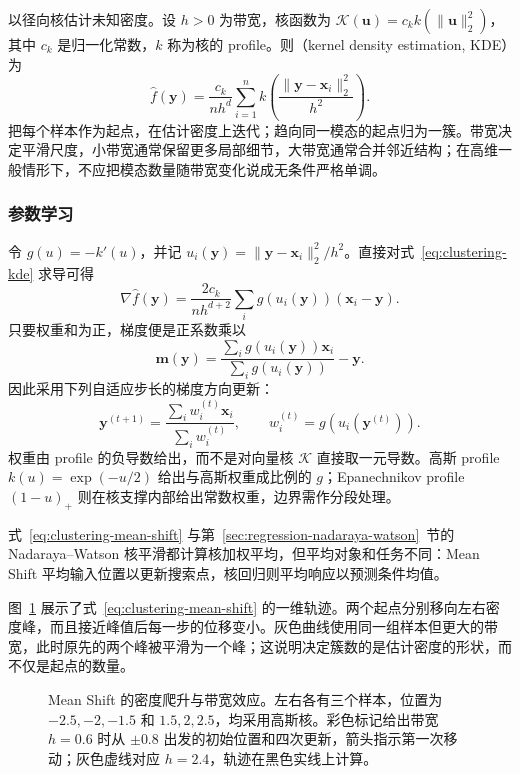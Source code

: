 以径向核估计未知密度。设 $h>0$ 为带宽，核函数为 $\mathcal{K}(\bm{u})=c_k k(\lVert\bm{u}\rVert_2^2)$，其中 $c_k$ 是归一化常数，$k$ 称为核的 profile。则（kernel density estimation, KDE）为
\begin{equation}
 \hat f(\bm{y})=\frac{c_k}{nh^d}
 \sum_{i=1}^n
 k\left(\frac{\lVert\bm{y}-\bm{x}_i\rVert_2^2}{h^2}\right).
 \label{eq:clustering-kde}
\end{equation}
把每个样本作为起点，在估计密度上迭代；趋向同一模态的起点归为一簇。带宽决定平滑尺度，小带宽通常保留更多局部细节，大带宽通常合并邻近结构；在高维一般情形下，不应把模态数量随带宽变化说成无条件严格单调。

\subsubsection{参数学习}

令 $g(u)=-k'(u)$，并记 $u_i(\bm{y})=\lVert\bm{y}-\bm{x}_i\rVert_2^2/h^2$。直接对式~\eqref{eq:clustering-kde} 求导可得
\[
 \nabla\hat f(\bm{y})=
 \frac{2c_k}{nh^{d+2}}
 \sum_i g(u_i(\bm{y}))(\bm{x}_i-\bm{y}).
\]
只要权重和为正，梯度便是正系数乘以
\[
 \bm{m}(\bm{y})=
 \frac{\sum_i g(u_i(\bm{y}))\bm{x}_i}
      {\sum_i g(u_i(\bm{y}))}-\bm{y}.
\]
因此采用下列自适应步长的梯度方向更新：
\begin{equation}
 \bm{y}^{(t+1)}=
 \frac{\sum_i w_i^{(t)}\bm{x}_i}{\sum_i w_i^{(t)}},
 \qquad w_i^{(t)}=g(u_i(\bm{y}^{(t)})).
 \label{eq:clustering-mean-shift}
\end{equation}
权重由 profile 的负导数给出，而不是对向量核 $\mathcal{K}$ 直接取一元导数。高斯 profile $k(u)=\exp(-u/2)$ 给出与高斯权重成比例的 $g$；Epanechnikov profile $(1-u)_+$ 则在核支撑内部给出常数权重，边界需作分段处理。

式~\eqref{eq:clustering-mean-shift} 与第~\ref{sec:regression-nadaraya-watson}~节的 Nadaraya--Watson 核平滑都计算核加权平均，但平均对象和任务不同：Mean Shift 平均输入位置以更新搜索点，核回归则平均响应以预测条件均值。

图~\ref{fig:clustering-mean-shift-modes} 展示了式~\eqref{eq:clustering-mean-shift} 的一维轨迹。两个起点分别移向左右密度峰，而且接近峰值后每一步的位移变小。灰色曲线使用同一组样本但更大的带宽，此时原先的两个峰被平滑为一个峰；这说明决定簇数的是估计密度的形状，而不仅是起点的数量。

\Needspace{90mm}
\begin{figure}[htbp]
 \centering
 
 \caption{Mean Shift 的密度爬升与带宽效应。左右各有三个样本，位置为 $-2.5,-2,-1.5$ 和 $1.5,2,2.5$，均采用高斯核。彩色标记给出带宽 $h=0.6$ 时从 $\pm0.8$ 出发的初始位置和四次更新，箭头指示第一次移动；灰色虚线对应 $h=2.4$，轨迹在黑色实线上计算。}
 \label{fig:clustering-mean-shift-modes}
\end{figure}

